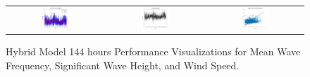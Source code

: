 \begin{figure}[ht!]
\begin{tabular}{ccc}
    \includegraphics[width=0.32\textwidth]{graphs/hybrid/144 hours/wind_speed/actual vs forecast.jpg} &
    \includegraphics[width=0.32\textwidth]{graphs/hybrid/144 hours/wind_speed/residuals.jpg} &
    \includegraphics[width=0.32\textwidth]{graphs/hybrid/144 hours/wind_speed/scatter plot.jpg} \\
  \end{tabular}
  \caption{Hybrid Model 144 hours Performance Visualizations for Mean Wave Frequency, Significant Wave Height, and Wind Speed.}
  \label{fig:hybrid_144_hours}
\end{figure}


